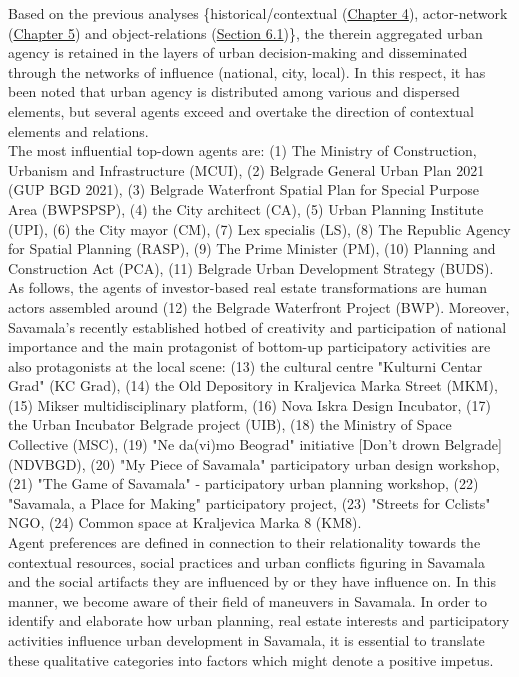\documentclass[11pt]{report}
\begin{document}
Based on the previous analyses \{historical/contextual (\href{Chapter 4}{Chapter 4}), actor-network (\href{Chapter 5}{Chapter 5}) and object-relations (\href{Section 6.1}{Section 6.1})\}, the therein aggregated urban agency is retained in the layers of urban decision-making and disseminated through the networks of influence (national, city, local).
In this respect, it has been noted that urban agency is distributed among various and dispersed elements, but several agents exceed and overtake the direction of contextual elements and relations.
\\

The most influential top-down agents are: 
(1) The Ministry of Construction, Urbanism and Infrastructure (MCUI),
(2) Belgrade General Urban Plan 2021 (GUP BGD 2021),
(3) Belgrade Waterfront Spatial Plan for Special Purpose Area (BWPSPSP), 
(4) the City architect (CA),
(5) Urban Planning Institute (UPI),
(6) the City mayor (CM),
(7) Lex specialis (LS),
(8) The Republic Agency for Spatial Planning (RASP),
(9) The Prime Minister (PM),
(10) Planning and Construction Act (PCA),
(11) Belgrade Urban Development Strategy (BUDS).
\\

As follows, the agents of investor-based real estate transformations are human actors assembled around
(12) the Belgrade Waterfront Project (BWP). Moreover, Savamala’s recently established  hotbed of creativity and participation of national importance and the main protagonist of bottom-up participatory activities are also protagonists at the local scene: (13) the cultural centre "Kulturni Centar Grad" (KC Grad),
(14) the Old Depository in Kraljevica Marka Street (MKM), (15) Mikser multidisciplinary platform, (16) Nova Iskra Design Incubator, (17) the Urban Incubator Belgrade project (UIB), (18) the Ministry of Space Collective (MSC),
(19) "Ne da(vi)mo Beograd" initiative [Don't drown Belgrade] (NDVBGD),
(20) "My Piece of Savamala" participatory urban design workshop,
(21) "The Game of Savamala" - participatory urban planning workshop,
(22) "Savamala, a Place for Making" participatory project,
(23) "Streets for Cclists" NGO,
(24) Common space at Kraljevica Marka 8 (KM8).
\\

Agent preferences are defined in connection to their relationality towards the contextual resources, social practices and urban conflicts figuring in Savamala and the social artifacts they are influenced by or they have influence on.
In this manner, we become aware of their field of maneuvers in Savamala.
In order to identify and elaborate how urban planning, real estate interests and participatory activities influence urban development in Savamala, it is essential to translate these qualitative categories into factors which might denote a positive impetus.
\\
\end{document}
